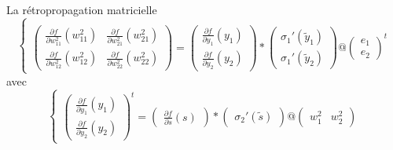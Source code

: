 \begin{frame}{La rétropropagation matricielle}
\begin{equation}
\begin{cases}
            \\
            \begin{pmatrix}
                \frac{\partial f}{\partial w^2_{11}}(w^2_{11})  & \frac{\partial f}{\partial w^2_{21}}(w^2_{21}) \\
                \frac{\partial f}{\partial w^2_{12}}(w^2_{12}) & \frac{\partial f}{\partial w^2_{22}}(w^2_{22})
            \end{pmatrix}
            =
            \begin{pmatrix}
                \frac{\partial f}{\partial y_1}(y_1) \\
                \frac{\partial f}{\partial y_2}(y_2)
            \end{pmatrix}
            *
            \begin{pmatrix}
                \sigma_1 '(\tilde{y}_1) \\
                \sigma_1 '(\tilde{y}_2)
            \end{pmatrix}
            @ 
            \begin{pmatrix}
                e_1 \\
                e_2
            \end{pmatrix} ^t
        \end{cases}
    \end{equation}
    avec
    \begin{equation}
        \begin{cases}
            \begin{pmatrix}
                \frac{\partial f}{\partial y_1}(y_1) \\
                \frac{\partial f}{\partial y_2}(y_2)
            \end{pmatrix} ^t
            =
            \begin{pmatrix}
                \frac{\partial f}{\partial s}(s) 
            \end{pmatrix}
            *
            \begin{pmatrix}
                \sigma_2 '(\tilde{s}) 
            \end{pmatrix}
            @
            \begin{pmatrix}
                w^2_1 & w^2_2                
            \end{pmatrix}
        \end{cases}
    \end{equation}
\end{frame}

